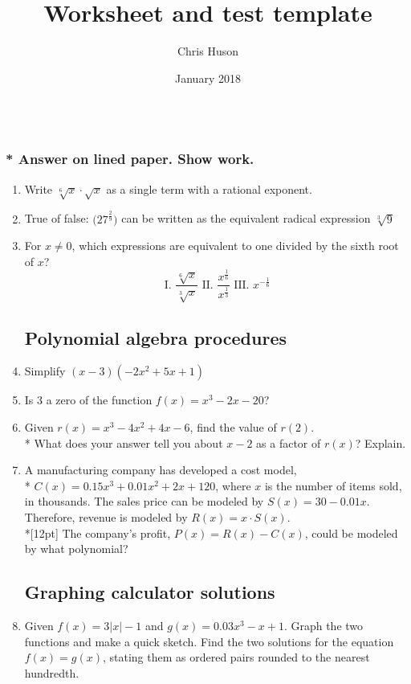 \documentclass[12pt, oneside]{article}
\title{Worksheet and test template}
\author{Chris Huson}
\date{January 2018}
\begin{document}
\subsubsection*{\\* Answer on lined paper. Show work.}

\begin{enumerate}

\vspace{0.5 cm}

\subsection*{Rational exponents and radicals}

\item Write $\sqrt[6]{x} \cdot \sqrt{x}$ as a single term with a rational exponent.

\item True of false:  $\displaystyle \big( 27^\frac{2}{9} \big) $ can be written as the equivalent radical expression $\sqrt[3]9$

\item For $x \neq 0$, which expressions are equivalent to one divided by the sixth root of $x$?
\[ \text{I. } \frac{\sqrt[6]{x}}{\sqrt[3]{x}} \text{  II. } \frac{x^{\frac{1}{6}}}{x^{\frac{1}{3}}} \text{  III. } x^{-\frac{1}{6}} \]

\subsection*{Polynomial algebra procedures}
\item Simplify $(x-3)(-2x^2+5x+1)$
\item Is 3 a zero of the function $f(x)=x^3-2x-20$?

\item Given $r(x)=x^3-4x^2+4x-6$, find the value of $r(2)$.\\*
What does your answer tell you about $x-2$ as a factor of $r(x)$? Explain.

\item A manufacturing company has developed a cost model,\\* $C(x)=0.15x^3 +0.01x^2+2x+120$, where $x$ is the number of items sold, in thousands. The sales price can be modeled by $S(x)=30-0.01x$. Therefore, revenue is modeled by $R(x)=x \cdot S(x)$.\\*[12pt]
The company’s profit, $P(x)=R(x)-C(x)$, could be modeled by what polynomial?

\subsection*{Graphing calculator solutions}
\item Given $f(x) = 3|x|-1$ and $g(x)=0.03x^3-x+1$. Graph the two functions and make a quick sketch. Find the two solutions for the equation $f(x)=g(x)$, stating them as ordered pairs rounded to the nearest hundredth.


\end{enumerate}
\end{document}
